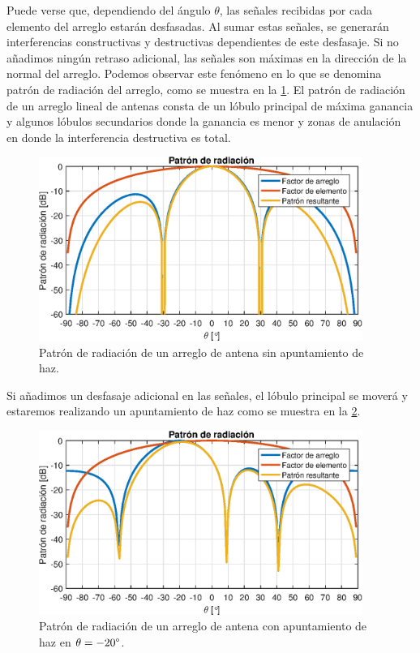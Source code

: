 \documentclass{article}
\newenvironment{standalone}{\begin{preview}}{\end{preview}}
\begin{document}
\begin{standalone}
  Puede verse que, dependiendo del ángulo $\theta$, las señales recibidas por cada elemento del arreglo estarán desfasadas.
  Al sumar estas señales, se generarán interferencias constructivas y destructivas dependientes de este desfasaje.
  Si no añadimos ningún retraso adicional, las señales son máximas en la dirección de la normal del arreglo.
  Podemos observar este fenómeno en lo que se denomina patrón de radiación del arreglo, como se muestra en la \cref{fig:patron-radiacion-sin-apuntamiento}.
  El patrón de radiación de un arreglo lineal de antenas consta de un lóbulo principal de máxima ganancia y algunos lóbulos secundarios donde la ganancia es menor y zonas de anulación en donde la interferencia destructiva es total.

  \begin{figure}[!htbp]
    \centering
    \includegraphics[width=\linewidth, height=60mm, keepaspectratio]{../images/radiation-pattern-broadside.eps}
    \caption{Patrón de radiación de un arreglo de antena sin apuntamiento de haz.}
    \label{fig:patron-radiacion-sin-apuntamiento}
  \end{figure}

  Si añadimos un desfasaje adicional en las señales, el lóbulo principal se moverá y estaremos realizando un apuntamiento de haz como se muestra en la \cref{fig:patron-radiacion-con-apuntamiento}.

  \begin{figure}[!htbp]
    \centering
    \includegraphics[width=\linewidth, height=60mm, keepaspectratio]{../images/radiation-pattern-beamforming.eps}
    \caption{Patrón de radiación de un arreglo de antena con apuntamiento de haz en $\theta = -20\degree$.}
    \label{fig:patron-radiacion-con-apuntamiento}
  \end{figure}


\end{standalone}
\end{document}
